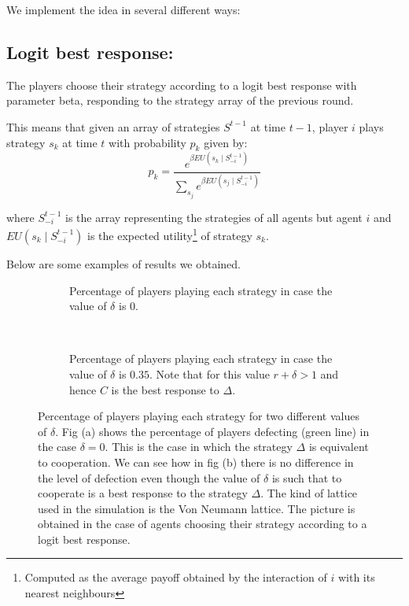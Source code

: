 \documentclass{article}
\begin{document}
We implement the idea in several different ways:

\subsection{Logit best response:}
The players choose their strategy according to a logit best response with parameter beta, responding to the strategy array of the previous round.

This means that given an array of strategies $S^{t-1}$ at time $t-1$, player $i$ plays strategy $s_k$ at time $t$ with probability $p_k$ given by:
$$
p_{k}=\frac{e^{\beta EU\left(s_{k}\mid S_{-i}^{t-1}\right)}}{\sum_{s_{j}}e^{\beta EU\left(s_{j}\mid S_{-i}^{t-1}\right)}}
$$

where $ S_{-i}^{t-1}$ is the array representing the strategies of all agents but agent $i$
and $EU\left(s_{k}\mid S_{-i}^{t-1}\right)$ is the expected utility\footnote{Computed as the average payoff obtained by the interaction of $i$ with its nearest neighbours} of strategy $s_k$.

Below are some examples of results we obtained.
\begin{figure}[htbp] 
\centering
\begin{subfigure}[t]{0.47\textwidth}
  \centering
  \caption{Percentage of players playing each strategy in case the value of $\delta$ is 0.}
  \label{fig:BR_nodelta} 
\end{subfigure}%
~
~
\begin{subfigure}[t]{0.47\textwidth}
  \centering
  \caption{Percentage of players playing each strategy in case the value of $\delta$ is $0.35$. Note that for this value $r+\delta >1$ and hence $C$ is the best response to $\Delta$.}
  \label{fig:BR_delta} 
\end{subfigure}
\caption{Percentage of players playing each strategy for two different values of $\delta$.
Fig (a) shows the percentage of players defecting (green line) in the case $\delta =0$. This is the case in which the strategy $\Delta$ is equivalent to cooperation.
We can see how in fig (b) there is no difference in the level of defection even though the value of $\delta$ is such that to cooperate is a best response to the strategy $\Delta$.
The kind of lattice used in the simulation is the Von Neumann lattice.
The picture is obtained in the case of agents choosing their strategy according to a logit best response.
}
\label{fig:BR}
\end{figure} 
\end{document}
